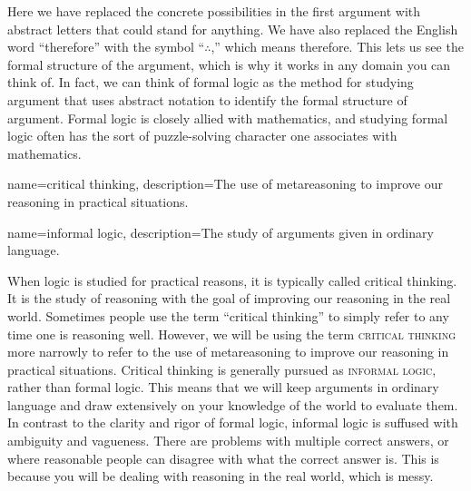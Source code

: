 Here we have replaced the concrete possibilities in the first argument with abstract letters that could stand for anything. We have also replaced the English word ``therefore'' with the symbol ``$\therefore$,'' which means therefore. This lets us see the formal structure of the argument, which is why it works in any domain you can think of. In fact, we can think of formal logic as the method for studying argument that uses abstract notation to identify the formal structure of argument.  Formal logic is closely allied with mathematics, and studying formal logic often has the sort of puzzle-solving character one associates with mathematics. 
	{
	{
{}	
	{}	}}
 
{
name=critical thinking,
description={The use of metareasoning to improve our reasoning in practical situations.}
}

{
name=informal logic,
description={The study of arguments given in ordinary language.}
}


When logic is studied for practical reasons, it is typically called critical thinking. It is the study of reasoning with the goal of improving our reasoning in the real world. Sometimes people use the term ``critical thinking'' to simply refer to any time one is reasoning well. However, we will be using the term \textsc{\gls{critical thinking}} more narrowly to refer to the use of metareasoning to improve our reasoning in practical situations.  \label{def:Critical_Thinking} Critical thinking is generally pursued as \textsc{\gls{informal logic}}, rather than formal logic. This means that we will keep arguments in ordinary language and draw extensively on your knowledge of the world to evaluate them. In contrast to the clarity and rigor of formal logic, informal logic is suffused with ambiguity and vagueness. There are problems  with multiple correct answers, or where reasonable people can disagree with what the correct answer is. This is because you will be dealing with reasoning in the real world, which is messy. \label{messiness_warning} 
\label{ver_var} 
  

